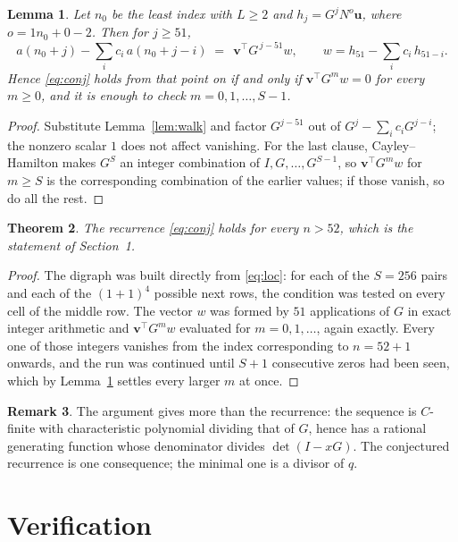 \documentclass[11pt,a4paper]{article}
\theoremstyle{plain}
\newtheorem{theorem}{Theorem}
\newtheorem{lemma}[theorem]{Lemma}
\theoremstyle{definition}
\newtheorem{remark}[theorem]{Remark}
\begin{document}
\begin{lemma}\label{lem:crit}
Let $n_0$ be the least index with $L\ge2$ and $h_j=G^{j}N^{o}\mathbf{u}$, where
$o=1n_0+0-2$. Then for $j\ge51$,
\[
a(n_0+j)-\sum_i c_i\,a(n_0+j-i)\;=\;\,\mathbf{v}^{\!\top}G^{\,j-51}w,
\qquad w=h_{51}-\sum_i c_i\,h_{51-i} .
\]
Hence \eqref{eq:conj} holds from that point on if and only if
$\mathbf{v}^{\!\top}G^{m}w=0$ for every $m\ge0$, and it is enough to check
$m=0,1,\dots,S-1$.
\end{lemma}

\begin{proof}
Substitute Lemma~\ref{lem:walk} and factor $G^{j-51}$ out of
$G^{j}-\sum_ic_iG^{j-i}$; the nonzero scalar $1$ does not affect
vanishing. For the last clause, Cayley--Hamilton makes $G^{S}$ an integer combination of
$I,G,\dots,G^{S-1}$, so $\mathbf{v}^{\!\top}G^{m}w$ for $m\ge S$ is the corresponding
combination of the earlier values; if those vanish, so do all the rest.
\end{proof}

\begin{theorem}
The recurrence \eqref{eq:conj} holds for every $n>52$, which is the statement of
Section~1.
\end{theorem}

\begin{proof}
The digraph was built directly from \eqref{eq:loc}: for each of the $S=256$ pairs and each
of the $(1+1)^{4}$ possible next rows, the condition was tested on every cell of
the middle row. The vector $w$ was formed by $51$ applications of $G$ in exact integer
arithmetic and $\mathbf{v}^{\!\top}G^{m}w$ evaluated for $m=0,1,\dots$, again exactly.
Every one of those integers vanishes from the index corresponding to $n=52+1$ onwards,
and the run was continued until $S+1$ consecutive zeros had been seen, which by
Lemma~\ref{lem:crit} settles every larger $m$ at once.
\end{proof}

\begin{remark}
The argument gives more than the recurrence: the sequence is $C$-finite with characteristic
polynomial dividing that of $G$, hence has a rational generating function whose denominator
divides $\det(I-xG)$. The conjectured recurrence is one consequence; the minimal one is a
divisor of $q$.
\end{remark}

\section{Verification}
\end{document}
